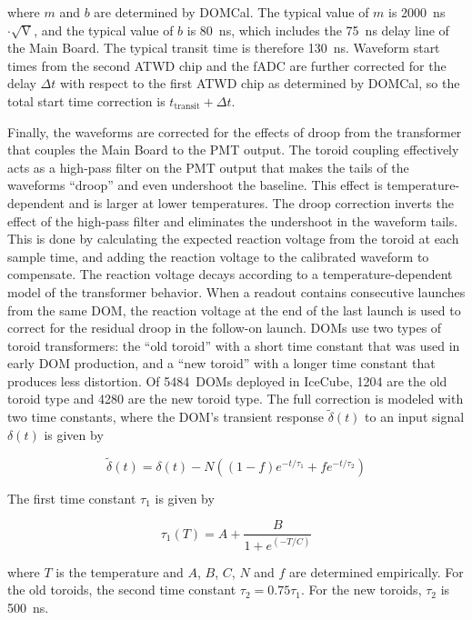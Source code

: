 \noindent where $m$ and $b$ are determined by DOMCal. The typical value of $m$
is 2000~ns$\cdot \sqrt{\mathrm{V}}$, and the typical value of $b$ is
80~ns, which includes the 75~ns delay line of the Main Board. The
typical transit time is therefore 130~ns.  Waveform start times from the
second ATWD chip and the fADC are further 
corrected for the delay $\Delta t$ with respect to the first ATWD
chip as determined by DOMCal, so the total start time correction is
$t_{\mathrm{transit}} + \Delta t$. 

Finally, the waveforms are corrected for the effects of droop from the
transformer that couples the Main Board to the PMT output. The toroid
coupling effectively acts as a high-pass filter on the PMT output
that makes the tails of the waveforms ``droop'' and even
undershoot the baseline. This effect is temperature-dependent and is larger
at lower temperatures. The droop correction inverts the effect of the high-pass
filter and eliminates the undershoot in the waveform tails. This is
done by calculating the expected reaction voltage from the toroid at
each sample time, and adding the reaction voltage to the calibrated waveform
to compensate. The reaction voltage decays 
according to a temperature-dependent model of the transformer behavior. 
When a readout contains consecutive launches from the same
DOM, the reaction voltage at the end of the last launch is used to
correct for the residual droop in the follow-on launch.  DOMs
use two types of toroid transformers: the ``old toroid'' with a short
time constant that was used in early DOM production, and a ``new
toroid'' with a longer time constant that produces less
distortion. Of 5484~DOMs deployed in IceCube, 1204 are the old
toroid type and 4280 are the new toroid type. The full correction is modeled with two time constants,
where the DOM's transient response $\tilde{\delta}(t)$ to an input
signal $\delta(t)$ is given by

\begin{equation}
\tilde{\delta}(t) = \delta (t) - N((1 - f) e^{-t/\tau_1} +f
e^{-t/\tau_2})
\end{equation}

\noindent The first time constant $\tau_1$ is given by 

\begin{equation}
\tau_1(T) = A + \frac{B}{1 + e^{(-T/C)}}
\end{equation}

\noindent where $T$ is the temperature and $A$, $B$, $C$, $N$ and $f$ are determined empirically.
For the old toroids, the second time constant $\tau_2 =0.75\tau_1$. For the
new toroids, $\tau_2$ is 500~ns.

